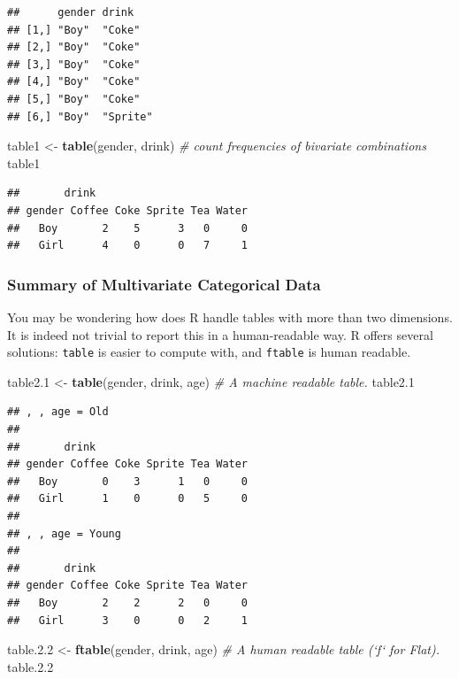 \documentclass[]{book}
\newenvironment{Shaded}{\begin{snugshade}}{\end{snugshade}}
\newcommand{\KeywordTok}[1]{\textcolor[rgb]{0.13,0.29,0.53}{\textbf{#1}}}
\newcommand{\DecValTok}[1]{\textcolor[rgb]{0.00,0.00,0.81}{#1}}
\newcommand{\FloatTok}[1]{\textcolor[rgb]{0.00,0.00,0.81}{#1}}
\newcommand{\StringTok}[1]{\textcolor[rgb]{0.31,0.60,0.02}{#1}}
\newcommand{\CommentTok}[1]{\textcolor[rgb]{0.56,0.35,0.01}{\textit{#1}}}
\newcommand{\NormalTok}[1]{#1}
\theoremstyle{definition}
\theoremstyle{definition}
\theoremstyle{definition}
\theoremstyle{remark}
\begin{document}
\begin{verbatim}
##      gender drink   
## [1,] "Boy"  "Coke"  
## [2,] "Boy"  "Coke"  
## [3,] "Boy"  "Coke"  
## [4,] "Boy"  "Coke"  
## [5,] "Boy"  "Coke"  
## [6,] "Boy"  "Sprite"
\end{verbatim}

\begin{Shaded}
\begin{Highlighting}[]
\NormalTok{table1 <-}\StringTok{ }\KeywordTok{table}\NormalTok{(gender, drink) }\CommentTok{# count frequencies of bivariate combinations}
\NormalTok{table1                                      }
\end{Highlighting}
\end{Shaded}

\begin{verbatim}
##       drink
## gender Coffee Coke Sprite Tea Water
##   Boy       2    5      3   0     0
##   Girl      4    0      0   7     1
\end{verbatim}

\subsubsection{Summary of Multivariate Categorical
Data}\label{summary-of-multivariate-categorical-data}

You may be wondering how does R handle tables with more than two
dimensions. It is indeed not trivial to report this in a human-readable
way. R offers several solutions: \texttt{table} is easier to compute
with, and \texttt{ftable} is human readable.

\begin{Shaded}
\begin{Highlighting}[]
\NormalTok{table2.}\DecValTok{1}\NormalTok{ <-}\StringTok{ }\KeywordTok{table}\NormalTok{(gender, drink, age) }\CommentTok{# A machine readable table. }
\NormalTok{table2.}\DecValTok{1}
\end{Highlighting}
\end{Shaded}

\begin{verbatim}
## , , age = Old
## 
##       drink
## gender Coffee Coke Sprite Tea Water
##   Boy       0    3      1   0     0
##   Girl      1    0      0   5     0
## 
## , , age = Young
## 
##       drink
## gender Coffee Coke Sprite Tea Water
##   Boy       2    2      2   0     0
##   Girl      3    0      0   2     1
\end{verbatim}

\begin{Shaded}
\begin{Highlighting}[]
\NormalTok{table.}\FloatTok{2.2}\NormalTok{ <-}\StringTok{ }\KeywordTok{ftable}\NormalTok{(gender, drink, age) }\CommentTok{# A human readable table (`f` for Flat).}
\NormalTok{table.}\FloatTok{2.2}
\end{Highlighting}
\end{Shaded}
\end{document}
